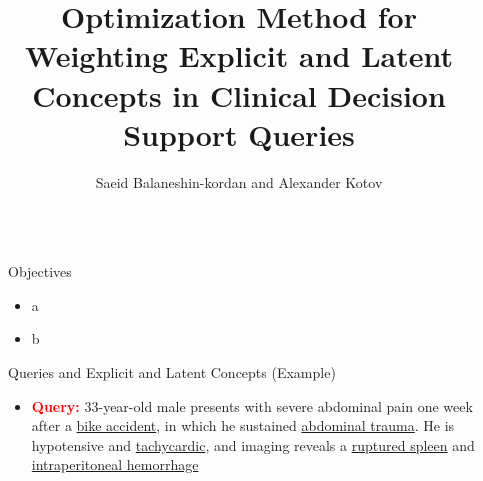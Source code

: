 \documentclass[final]{beamer}
\title{Optimization Method for Weighting Explicit and Latent Concepts in Clinical Decision Support Queries} %
\author{  Saeid Balaneshin-kordan and
 Alexander Kotov} %
\institute{Computer Science Department, Wayne State University} %
\newlength{\sepwid}
\newlength{\onecolwid}
\begin{document}

\setlength{\belowcaptionskip}{2ex} %
\setlength\belowdisplayshortskip{2ex} %

\begin{frame}[t] %

\begin{columns}[t] %

\begin{column}{\sepwid}\end{column} %

\begin{column}{\onecolwid} %


\begin{alertblock}{Objectives}
\begin{itemize}
\item a
\item b
\end{itemize}
\end{alertblock}


\begin{block}{Queries and Explicit and Latent Concepts (Example)}



\begin{itemize}

\item  \textcolor{red}{\textbf{Query:}} 33-year-old male presents with severe abdominal pain one week after a \underline{bike accident}, in which he sustained \underline{abdominal trauma}. He is hypotensive and \underline{tachycardic}, and imaging reveals a \underline{ruptured spleen} and \underline{intraperitoneal hemorrhage}


\end{itemize}
\end{block}
\end{column}
\end{columns}
\end{frame}
\end{document}

